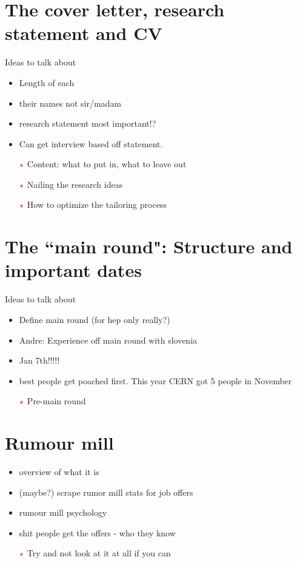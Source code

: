 \documentclass[10pt]{beamer}
\begin{document}
\section{The cover letter, research statement and CV}
\begin{frame}
Ideas to talk about
\begin{itemize}
	\item Length of each
	\item their names not sir/madam
	\item research statement most important!?
	\item Can get interview based off statement.
	\item [{$\color{red}\star$}] Content: what to put in, what to leave out
	\item [{$\color{red}\star$}] Nailing the research ideas
	\item [{$\color{red}\star$}] How to optimize the tailoring process
\end{itemize}

\end{frame}
\section{The ``main round": Structure and important dates}
\begin{frame}
Ideas to talk about
	\begin{itemize}
		\item Define main round (for hep only really?)
		\item Andre: Experience off main round with slovenia 
		\item Jan 7th!!!!!
		\item best people get poached first. This year CERN got 5 people in November
		\item [{$\color{red}\star$}] Pre-main round
	\end{itemize}
\end{frame}


\section{Rumour mill}
\begin{frame}
\begin{itemize}
	\item overview of what it is
		\item (maybe?) scrape rumor mill stats for job offers
		\item rumour mill psychology
		\item shit people get the offers  - who they know 
		\item [{$\color{red}\star$}] Try and not look at it at all if you can
\end{itemize}
\end{frame}
\end{document}
